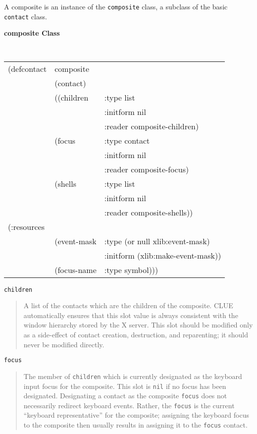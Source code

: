 \documentclass[twoside]{book}
\begin{document}
\begin{sloppy}
A composite is an instance of the {\tt composite} class, a
subclass of the basic {\tt contact} class.

{\samepage
{\large {\bf composite \hfill Class}} 
\begin{flushright} \parbox[t]{6.125in}{
\tt
\begin{tabular}{lll}
\raggedright
(defcontact & composite  & \\ 
& (contact) & \\
& ((children  & :type list\\
&     & :initform nil\\
&     & :reader composite-children)\\
& (focus  & :type contact\\
&     & :initform nil\\
&     & :reader composite-focus)\\
& (shells &:type list \\        
&     & :initform nil\\
&     & :reader composite-shells))\\
(:resources\\
&(event-mask & :type (or null xlib:event-mask)\\
&	     & :initform (xlib:make-event-mask))\\
&(focus-name & :type symbol)))
\end{tabular}
\rm

}\end{flushright}}

\begin{flushright} \parbox[t]{6.125in}{
{\tt children}
\begin{quote}
A list of the contacts which are the children of the composite. 
CLUE automatically ensures that this slot value is always consistent with the
window hierarchy stored by the X server.
This slot should be modified only as a side-effect of contact creation, 
destruction, and reparenting; it should
never be modified directly.
\end{quote}
}\end{flushright}


\begin{flushright} \parbox[t]{6.125in}{
{\tt focus}
\begin{quote}
The member of {\tt children} which is currently designated as the keyboard input
focus for the composite. This slot is {\tt nil} if no focus has been designated.
Designating a contact as  the composite {\tt focus} does not necessarily redirect
keyboard events. Rather, the {\tt focus} is the current ``keyboard
representative'' for the composite; assigning the keyboard focus to the
composite then usually results in assigning it to the {\tt focus}
contact. \end{quote} }\end{flushright}


\end{sloppy}
\end{document}
